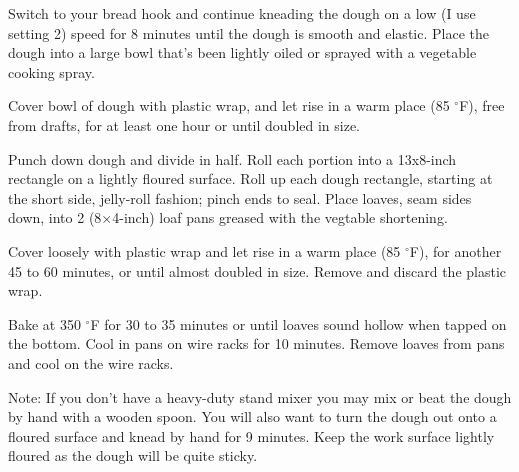 \documentclass{article}
\begin{document}
\begin{multicols}{2}
    Switch to your bread hook and continue kneading the dough on a low (I use setting 2)
    speed for 8 minutes until the dough is smooth and elastic. Place the dough into a
    large bowl that's been lightly oiled or sprayed with a vegetable cooking spray.
    \medskip

    Cover bowl of dough with plastic wrap, and let rise in a warm place (85 $^{\circ}$F), free from
    drafts, for at least one hour or until doubled in size.
    \medskip

    Punch down dough and divide in half. Roll each portion into a 13x8-inch rectangle on a
    lightly floured surface. Roll up each dough rectangle, starting at the short side,
    jelly-roll fashion; pinch ends to seal. Place loaves, seam sides down, into 2
    (8$\times$4-inch) loaf pans greased with the vegtable shortening.
    \medskip

    Cover loosely with plastic wrap and let rise in a warm place (85 $^{\circ}$F), for another
    45 to 60 minutes, or until almost doubled in size. Remove and discard the plastic wrap.
    \medskip

    Bake at 350 $^{\circ}$F for 30 to 35 minutes or until loaves sound hollow when tapped on the bottom.
    Cool in pans on wire racks for 10 minutes. Remove loaves from pans and cool on the wire racks.
    \medskip

\end{multicols}

Note: If you don't have a heavy-duty stand mixer you may mix or beat the dough by
hand with a wooden spoon. You will also want to turn the dough out onto a floured
surface and knead by hand for 9 minutes. Keep the work surface lightly floured as
the dough will be quite sticky.
\medskip

\end{document}
